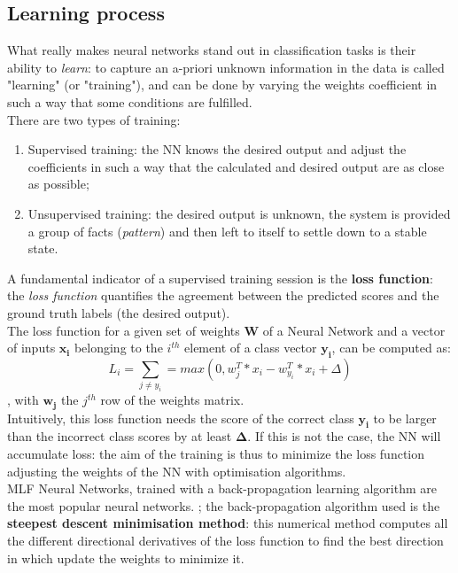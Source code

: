 \documentclass[../main.tex]{subfiles}
\begin{document}
\subsection{Learning process}
What really makes neural networks stand out in classification tasks is their ability to \textit{learn}: to capture an a-priori unknown information in the data is called "learning" (or "training"), and can be done by varying the weights coefficient in such a way that some conditions are fulfilled. \cite{Svozil1997} \\ 
There are two types of training: 
\begin{enumerate}
	\item Supervised training: the NN knows the desired output and adjust the coefficients in such a way that the calculated and desired output are as close as possible;
	\item Unsupervised training: the desired output is unknown, the system is provided a group of facts (\textit{pattern}) and then left to itself to settle down to a stable state.
\end{enumerate}
\vspace{5mm}
A fundamental indicator of a supervised training session is the \textbf{loss function}: the \textit{loss function} quantifies the agreement between the predicted scores and the ground truth labels (the desired output). \cite{Karpathy2018} \\
The loss function for a given set of weights \textbf{W} of a Neural Network and a vector of inputs $\mathbf{x_i}$ belonging to the $i^{th}$ element of a class vector $\mathbf{y_i}$, can be computed as: \\
$$ L_i = \sum_{j \neq y_i}=max(0,w_j^T*x_i - w_{y_i}^T*x_i+ \Delta )$$,
with $\mathbf{w_j}$ the $j^{th}$ row of the weights matrix. \\
Intuitively, this loss function needs the score of the correct class $\mathbf{y_i}$ to be larger than the incorrect class scores by at least $\mathbf{\Delta}$. If this is not the case, the NN will accumulate loss: the aim of the training is thus to minimize the loss function adjusting the weights of the NN with optimisation algorithms. \\
MLF Neural Networks, trained with a back-propagation learning algorithm are the most popular neural networks. \cite{Svozil1997}; the back-propagation algorithm used is the  \textbf{steepest descent minimisation method}: this numerical method computes all the different directional derivatives of the loss function to find the best direction in which update the weights to minimize it. \\
\end{document}
